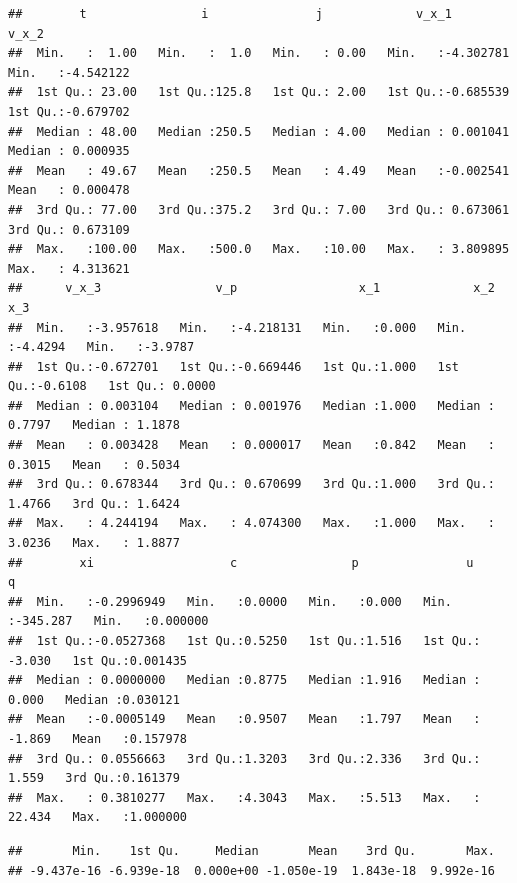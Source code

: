 \documentclass[
]{book}
\newenvironment{Shaded}{\begin{snugshade}}{\end{snugshade}}
\newcommand{\FunctionTok}[1]{\textcolor[rgb]{0.00,0.00,0.00}{#1}}
\newcommand{\NormalTok}[1]{#1}
\newcommand{\SpecialCharTok}[1]{\textcolor[rgb]{0.00,0.00,0.00}{#1}}
\begin{document}
\begin{verbatim}
##        t                i               j             v_x_1               v_x_2          
##  Min.   :  1.00   Min.   :  1.0   Min.   : 0.00   Min.   :-4.302781   Min.   :-4.542122  
##  1st Qu.: 23.00   1st Qu.:125.8   1st Qu.: 2.00   1st Qu.:-0.685539   1st Qu.:-0.679702  
##  Median : 48.00   Median :250.5   Median : 4.00   Median : 0.001041   Median : 0.000935  
##  Mean   : 49.67   Mean   :250.5   Mean   : 4.49   Mean   :-0.002541   Mean   : 0.000478  
##  3rd Qu.: 77.00   3rd Qu.:375.2   3rd Qu.: 7.00   3rd Qu.: 0.673061   3rd Qu.: 0.673109  
##  Max.   :100.00   Max.   :500.0   Max.   :10.00   Max.   : 3.809895   Max.   : 4.313621  
##      v_x_3                v_p                 x_1             x_2               x_3         
##  Min.   :-3.957618   Min.   :-4.218131   Min.   :0.000   Min.   :-4.4294   Min.   :-3.9787  
##  1st Qu.:-0.672701   1st Qu.:-0.669446   1st Qu.:1.000   1st Qu.:-0.6108   1st Qu.: 0.0000  
##  Median : 0.003104   Median : 0.001976   Median :1.000   Median : 0.7797   Median : 1.1878  
##  Mean   : 0.003428   Mean   : 0.000017   Mean   :0.842   Mean   : 0.3015   Mean   : 0.5034  
##  3rd Qu.: 0.678344   3rd Qu.: 0.670699   3rd Qu.:1.000   3rd Qu.: 1.4766   3rd Qu.: 1.6424  
##  Max.   : 4.244194   Max.   : 4.074300   Max.   :1.000   Max.   : 3.0236   Max.   : 1.8877  
##        xi                   c                p               u                  q           
##  Min.   :-0.2996949   Min.   :0.0000   Min.   :0.000   Min.   :-345.287   Min.   :0.000000  
##  1st Qu.:-0.0527368   1st Qu.:0.5250   1st Qu.:1.516   1st Qu.:  -3.030   1st Qu.:0.001435  
##  Median : 0.0000000   Median :0.8775   Median :1.916   Median :   0.000   Median :0.030121  
##  Mean   :-0.0005149   Mean   :0.9507   Mean   :1.797   Mean   :  -1.869   Mean   :0.157978  
##  3rd Qu.: 0.0556663   3rd Qu.:1.3203   3rd Qu.:2.336   3rd Qu.:   1.559   3rd Qu.:0.161379  
##  Max.   : 0.3810277   Max.   :4.3043   Max.   :5.513   Max.   :  22.434   Max.   :1.000000
\end{verbatim}

\begin{Shaded}
\end{Shaded}

\begin{verbatim}
##       Min.    1st Qu.     Median       Mean    3rd Qu.       Max. 
## -9.437e-16 -6.939e-18  0.000e+00 -1.050e-19  1.843e-18  9.992e-16
\end{verbatim}
\end{document}
